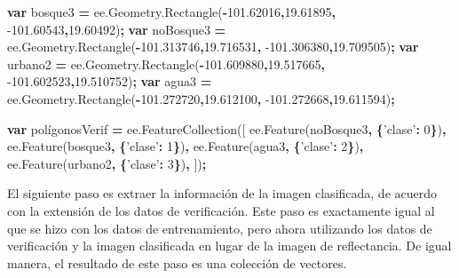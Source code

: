 \documentclass[
]{article}
\newenvironment{Shaded}{\begin{snugshade}}{\end{snugshade}}
\newcommand{\AttributeTok}[1]{\textcolor[rgb]{0.77,0.63,0.00}{#1}}
\newcommand{\DecValTok}[1]{\textcolor[rgb]{0.00,0.00,0.81}{#1}}
\newcommand{\FloatTok}[1]{\textcolor[rgb]{0.00,0.00,0.81}{#1}}
\newcommand{\KeywordTok}[1]{\textcolor[rgb]{0.13,0.29,0.53}{\textbf{#1}}}
\newcommand{\NormalTok}[1]{#1}
\newcommand{\OperatorTok}[1]{\textcolor[rgb]{0.81,0.36,0.00}{\textbf{#1}}}
\newcommand{\StringTok}[1]{\textcolor[rgb]{0.31,0.60,0.02}{#1}}
\newcommand{\VariableTok}[1]{\textcolor[rgb]{0.00,0.00,0.00}{#1}}
\begin{document}
\begin{Shaded}
\begin{Highlighting}[]
\KeywordTok{var}\NormalTok{ bosque3 }\OperatorTok{=} \VariableTok{ee}\NormalTok{.}\VariableTok{Geometry}\NormalTok{.}\AttributeTok{Rectangle}\NormalTok{(}\OperatorTok{-}\FloatTok{101.62016}\OperatorTok{,}\FloatTok{19.61895}\OperatorTok{,} 
  \FloatTok{-101.60543}\OperatorTok{,}\FloatTok{19.60492}\NormalTok{)}\OperatorTok{;}
\KeywordTok{var}\NormalTok{ noBosque3 }\OperatorTok{=} \VariableTok{ee}\NormalTok{.}\VariableTok{Geometry}\NormalTok{.}\AttributeTok{Rectangle}\NormalTok{(}\OperatorTok{-}\FloatTok{101.313746}\OperatorTok{,}\FloatTok{19.716531}\OperatorTok{,} 
  \FloatTok{-101.306380}\OperatorTok{,}\FloatTok{19.709505}\NormalTok{)}\OperatorTok{;}
\KeywordTok{var}\NormalTok{ urbano2 }\OperatorTok{=} \VariableTok{ee}\NormalTok{.}\VariableTok{Geometry}\NormalTok{.}\AttributeTok{Rectangle}\NormalTok{(}\OperatorTok{-}\FloatTok{101.609880}\OperatorTok{,}\FloatTok{19.517665}\OperatorTok{,} 
  \FloatTok{-101.602523}\OperatorTok{,}\FloatTok{19.510752}\NormalTok{)}\OperatorTok{;}
\KeywordTok{var}\NormalTok{ agua3 }\OperatorTok{=} \VariableTok{ee}\NormalTok{.}\VariableTok{Geometry}\NormalTok{.}\AttributeTok{Rectangle}\NormalTok{(}\OperatorTok{-}\FloatTok{101.272720}\OperatorTok{,}\FloatTok{19.612100}\OperatorTok{,} 
  \FloatTok{-101.272668}\OperatorTok{,}\FloatTok{19.611594}\NormalTok{)}\OperatorTok{;}

\KeywordTok{var}\NormalTok{ polígonosVerif }\OperatorTok{=} \VariableTok{ee}\NormalTok{.}\AttributeTok{FeatureCollection}\NormalTok{([}
  \VariableTok{ee}\NormalTok{.}\AttributeTok{Feature}\NormalTok{(noBosque3}\OperatorTok{,} \OperatorTok{\{}\StringTok{'clase'}\OperatorTok{:} \DecValTok{0}\OperatorTok{\}}\NormalTok{)}\OperatorTok{,}
  \VariableTok{ee}\NormalTok{.}\AttributeTok{Feature}\NormalTok{(bosque3}\OperatorTok{,} \OperatorTok{\{}\StringTok{'clase'}\OperatorTok{:} \DecValTok{1}\OperatorTok{\}}\NormalTok{)}\OperatorTok{,}
  \VariableTok{ee}\NormalTok{.}\AttributeTok{Feature}\NormalTok{(agua3}\OperatorTok{,} \OperatorTok{\{}\StringTok{'clase'}\OperatorTok{:} \DecValTok{2}\OperatorTok{\}}\NormalTok{)}\OperatorTok{,}
  \VariableTok{ee}\NormalTok{.}\AttributeTok{Feature}\NormalTok{(urbano2}\OperatorTok{,} \OperatorTok{\{}\StringTok{'clase'}\OperatorTok{:} \DecValTok{3}\OperatorTok{\}}\NormalTok{)}\OperatorTok{,}
\NormalTok{])}\OperatorTok{;}
\end{Highlighting}
\end{Shaded}

El siguiente paso es extraer la información de la imagen clasificada, de
acuerdo con la extensión de los datos de verificación. Este paso es
exactamente igual al que se hizo con los datos de entrenamiento, pero
ahora utilizando los datos de verificación y la imagen clasificada en
lugar de la imagen de reflectancia. De igual manera, el resultado de
este paso es una colección de vectores.
\end{document}
